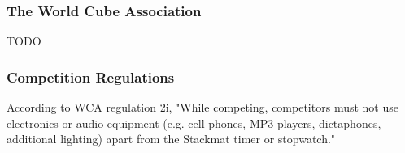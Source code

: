 \subsubsection{The World Cube Association}
\label{subsec:world-cube-association}
TODO

\subsubsection{Competition Regulations}
\label{subsec:competition-regulations}
According to WCA regulation 2i, "While competing, competitors must not use electronics or audio equipment (e.g. cell phones, MP3 players, dictaphones, additional lighting) apart from the Stackmat timer or stopwatch." \cite{wca-regulations}
